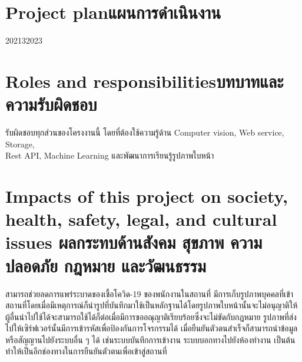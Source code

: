 \section{\ifenglish Project plan\else แผนการดำเนินงาน\fi}

\begin{plan}{12}{2021}{3}{2023}
\end{plan}

\section{\ifenglish Roles and responsibilities\else บทบาทและความรับผิดชอบ\fi}
รับผิดชอบทุกส่วนของโครงงานนี้ โดยที่ต้องใช้ความรู้ด้าน Computer vision, Web service, Storage, \\ Rest API, Machine Learning และพัฒนาการเรียนรู้รูปภาพใบหน้า

\section{\ifenglish%
Impacts of this project on society, health, safety, legal, and cultural issues
\else%
ผลกระทบด้านสังคม สุขภาพ ความปลอดภัย กฎหมาย และวัฒนธรรม
\fi}

สามารถช่วยลดการแพร่ระบาดของเชื้อโควิด-19 ของพนักงานในสถานที่ มีการเก็บรูปภาพบุคคลที่เข้าสถานที่โดยเมื่อมีเหตุการณ์ก็นำรูปที่บันทึกมาใช้เป็นหลักฐานได้โดยรูปภาพใบหน้านั้นจะไม่อนุญาติให้ผู้อื่นนำไปใช้ได้จะสามารถใช้ได้ก็ต่อเมื่อมีการขออณุญาติเรียบร้อยซึ่งจะไม่ขัดกับกฎหมาย 
รูปภาพที่ส่งไปให้เซิร์ฟเวอร์นั้นมีการเข้ารหัสเพื่อป้องกันการโจรกรรมได้ เมื่อยืนยันตัวตนสำเร็จก็สามารถนำข้อมูลหรือสัญญานไปยังระบบอื่น ๆ ได้ เช่นระบบบันทึกการเข้างาน ระบบบอกทางไปยังห้องทำงาน เป็นต้น ทำให้เป็นอีกช่องทางในการยืนยันตัวตนเพื่อเข้าสู่สถานที่
